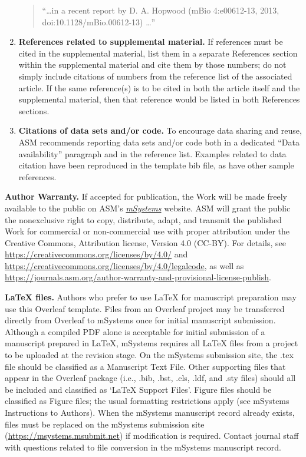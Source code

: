 \documentclass[lineno]{asm-article}
\begin{document}
\begin{enumerate}[label=(\roman*)]
\begin{quote}
``\ldots  in a recent report by D. A. Hopwood (mBio 4:e00612-13, 2013, doi:10.1128/mBio.00612-13) \ldots''
\end{quote}

\item \textbf{References related to supplemental material.} If references must be cited in the supplemental material, list them in a separate References section within the supplemental material and cite them by those numbers; do not simply include citations of numbers from the reference list of the associated article. If the same reference(s) is to be cited in both the article itself and the supplemental material, then that reference would be listed in both References sections.

\item \textbf{Citations of data sets and/or code.} To encourage data sharing and reuse, ASM recommends reporting data sets and/or code both in a dedicated “Data availability” paragraph and in the reference list. Examples related to data citation have been reproduced in the template bib file, as have other sample references.
\end{enumerate}

\textbf{Author Warranty.} If accepted for publication, the Work will be made freely available to the public on ASM's \textit{\href{https://journals.asm.org/journal/msystems}{mSystems}} website. ASM will grant the public the nonexclusive right to copy, distribute, adapt, and transmit the published Work for commercial or non-commercial use with proper attribution under the Creative Commons, Attribution license, Version 4.0 (CC-BY). For details, see \url{https://creativecommons.org/licenses/by/4.0/} and \url{https://creativecommons.org/licenses/by/4.0/legalcode}, as well as \url{https://journals.asm.org/author-warranty-and-provisional-license-publish}.

\textbf{\LaTeX{} files.} Authors who prefer to use \LaTeX{} for manuscript preparation may use this Overleaf template. Files from an Overleaf project may be transferred directly from Overleaf to mSystems once for initial manuscript submission. Although a compiled PDF alone is acceptable for initial submission of a manuscript prepared in \LaTeX{}, mSystems requires all \LaTeX{} files from a project to be uploaded at the revision stage. On the mSystems submission site, the .tex file should be classified as a Manuscript Text File. Other supporting files that appear in the Overleaf package (i.e., .bib, .bst, .cls, .ldf, and .sty files) should all be included and classified as `LaTeX Support Files'. Figure files should be classified as Figure files; the usual formatting restrictions apply (see mSystems Instructions to Authors). When the mSystems manuscript record already exists, files must be replaced on the mSystems submission site (\url{https://msystems.msubmit.net}) if modification is required. Contact journal staff with questions related to file conversion in the mSystems manuscript record.
\end{document}
